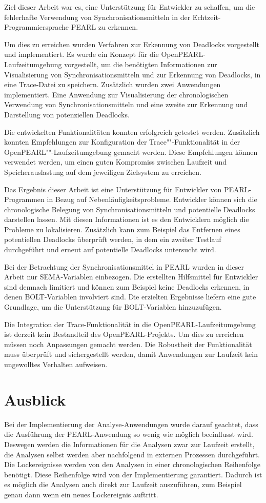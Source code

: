 Ziel dieser Arbeit war es, eine Unterstützung für Entwickler zu schaffen, um die
fehlerhafte Verwendung von Synchronisationsmitteln in der
Echtzeit-Programmiersprache PEARL zu erkennen.

Um dies zu erreichen wurden Verfahren zur Erkennung von Deadlocks vorgestellt
und implementiert. Es wurde ein Konzept für die OpenPEARL-Laufzeitumgebung
vorgestellt, um die benötigten Informationen zur Visualisierung von
Synchronisationsmitteln und zur Erkennung von Deadlocks, in eine Trace-Datei zu
speichern. Zusätzlich wurden zwei Anwendungen implementiert. Eine Anwendung zur
Visualisierung der chronologischen Verwendung von Synchronisationsmitteln und
eine zweite zur Erkennung und Darstellung von potenziellen Deadlocks.

Die entwickelten Funktionalitäten konnten erfolgreich getestet werden.
Zusätzlich konnten Empfehlungen zur Konfiguration der Trace""-Funktionalität in
der OpenPEARL""-Laufzeitumgebung gemacht werden. Diese Empfehlungen können
verwendet werden, um einen guten Kompromiss zwischen Laufzeit und
Speicherauslastung auf dem jeweiligen Zielsystem zu erreichen.

Das Ergebnis dieser Arbeit ist eine Unterstützung für Entwickler von
PEARL-Programmen in Bezug auf Nebenläufigkeitsprobleme. Entwickler können sich
die chronologische Belegung von Synchronisationsmitteln und potentielle
Deadlocks darstellen lassen. Mit diesen Informationen ist es den Entwicklern
möglich die Probleme zu lokalisieren. Zusätzlich kann zum Beispiel das Entfernen
eines potentiellen Deadlocks überprüft werden, in dem ein zweiter Testlauf
durchgeführt und erneut auf potentielle Deadlocks untersucht wird.

Bei der Betrachtung der Synchronisationsmittel in PEARL wurden in dieser Arbeit
nur \textrm{SEMA}-Variablen einbezogen. Die erstellten Hilfsmittel für
Entwickler sind demnach limitiert und können zum Beispiel keine Deadlocks
erkennen, in denen \textrm{BOLT}-Variablen involviert sind. Die erzielten
Ergebnisse liefern eine gute Grundlage, um die Unterstützung für
\textrm{BOLT}-Variablen hinzuzufügen.

Die Integration der Trace-Funktionalität in die OpenPEARL-Laufzeitumgebung ist
derzeit kein Bestandteil des OpenPEARL-Projekts. Um dies zu erreichen müssen
noch Anpassungen gemacht werden. Die Robustheit der Funktionalität muss
überprüft und sichergestellt werden, damit Anwendungen zur Laufzeit kein
ungewolltes Verhalten aufweisen.

\section{Ausblick}
Bei der Implementierung der Analyse-Anwendungen wurde darauf geachtet, dass die
Ausführung der PEARL-Anwendung so wenig wie möglich beeinflusst wird. Deswegen
werden die Informationen für die Analysen zwar zur Laufzeit erstellt, die
Analysen selbst werden aber nachfolgend in externen Prozessen durchgeführt. Die
Lockereignisse werden von den Analysen in einer chronologischen Reihenfolge
benötigt. Diese Reihenfolge wird von der Implementierung garantiert. Dadurch ist
es möglich die Analysen auch direkt zur Laufzeit auszuführen, zum Beispiel genau
dann wenn ein neues Lockereignis auftritt.

